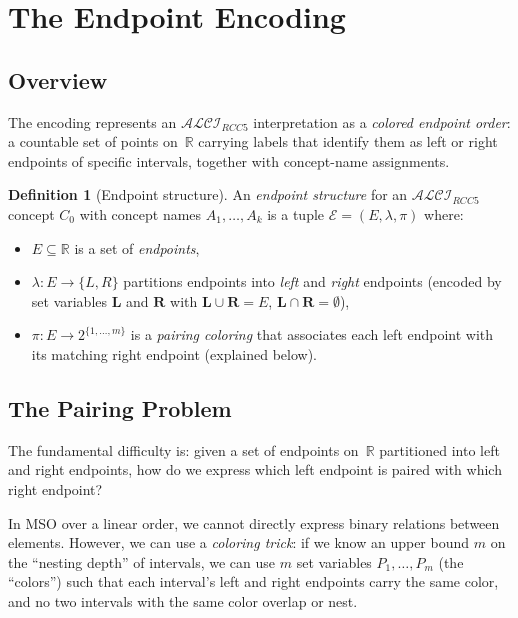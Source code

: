 \documentclass[a4paper,11pt]{article}
\theoremstyle{definition}
\newtheorem{definition}[theorem]{Definition}
\newcommand{\ALCIRCC}[1]{\ensuremath{\mathcal{ALCI}_{\mathit{RCC#1}}}}
\newcommand{\reals}{\ensuremath{\mathbb{R}}}
\begin{document}
\section{The Endpoint Encoding}
\label{sec:encoding}

\subsection{Overview}

The encoding represents an $\ALCIRCC{5}$ interpretation as a
\emph{colored endpoint order}: a countable set of points on~$\reals$
carrying labels that identify them as left or right endpoints of
specific intervals, together with concept-name assignments.

\begin{definition}[Endpoint structure]
\label{def:endpoint}
An \emph{endpoint structure} for an $\ALCIRCC{5}$ concept $C_0$
with concept names $A_1, \ldots, A_k$ is a tuple
$\mathcal{E} = (E, \lambda, \pi)$ where:
\begin{itemize}[nosep]
  \item $E \subseteq \reals$ is a set of \emph{endpoints},
  \item $\lambda : E \to \{L, R\}$ partitions endpoints into
    \emph{left} and \emph{right} endpoints (encoded by set variables
    $\mathbf{L}$ and $\mathbf{R}$ with
    $\mathbf{L} \cup \mathbf{R} = E$,
    $\mathbf{L} \cap \mathbf{R} = \emptyset$),
  \item $\pi : E \to 2^{\{1, \ldots, m\}}$ is a \emph{pairing
    coloring} that associates each left endpoint with its matching
    right endpoint (explained below).
\end{itemize}
\end{definition}

\subsection{The Pairing Problem}
\label{sec:pairing}

The fundamental difficulty is: given a set of endpoints on~$\reals$
partitioned into left and right endpoints, how do we express which
left endpoint is paired with which right endpoint?

In MSO over a linear order, we cannot directly express binary
relations between elements.  However, we can use a \emph{coloring
trick}: if we know an upper bound $m$ on the ``nesting depth'' of
intervals, we can use $m$ set variables $P_1, \ldots, P_m$ (the
``colors'') such that each interval's left and right endpoints carry
the same color, and no two intervals with the same color overlap or
nest.
\end{document}
